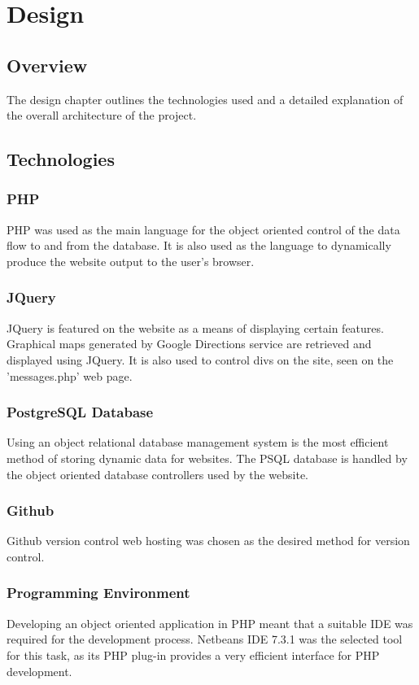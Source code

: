 \chapter{Design}

\section{Overview}
The design chapter outlines the technologies used and a detailed explanation of the overall architecture of the project.

\section{Technologies}
	\subsection{PHP}
		PHP was used as the main language for the object oriented control of the data flow to and from the database. It is also used as the language to dynamically produce the website output to the user's browser.
		
	\subsection{JQuery}
		JQuery is featured on the website as a means of displaying certain features. Graphical maps generated by Google Directions \cite{google_directions_api} service are retrieved and displayed using JQuery. It is also used to control divs on the site, seen on the 'messages.php' web page.
			
	\subsection{PostgreSQL Database}
	Using an object relational database management system is the most efficient method of storing dynamic data for websites. The PSQL database is handled by the object oriented database controllers used by the website.
	
	\subsection{Github}
		Github \cite{github} version control web hosting was chosen as the desired method for version control.
		
	\subsection{Programming Environment}
		Developing an object oriented application in PHP meant that a suitable IDE was required for the development process. Netbeans IDE 7.3.1 was the selected tool for this task, as its PHP plug-in provides a very efficient interface for PHP development. 
		 
